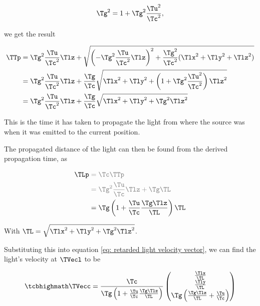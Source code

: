 \begin{derivation}
	\begin{equation}
		\Tg ^2 = 1+\Tg ^2\frac{\Tu ^2}{\Tc ^2},
	\end{equation}

	we get the result

	\begin{equation}
		\begin{aligned}
			\TTp  & = \Tg ^2\frac{\Tu }{\Tc ^2} \Tlz  + \sqrt{\left(-\Tg ^2\frac{\Tu }{\Tc ^2} \Tlz  \right)^2+\frac{\Tg ^2}{\Tc ^2}(\Tlx ^2 + \Tly ^2+ \Tlz ^2)} \\
			    & = \Tg ^2\frac{\Tu }{\Tc ^2} \Tlz  + \frac{\Tg }{\Tc }\sqrt{\Tlx ^2+ \Tly ^2+\left(1+\Tg ^2\frac{\Tu ^2}{\Tc ^2}\right) \Tlz ^2}               \\
			    & = \Tg ^2\frac{\Tu }{\Tc ^2} \Tlz  + \frac{\Tg }{\Tc }\sqrt{\Tlx ^2 + \Tly ^2+\Tg ^2 \Tlz ^2}
		\end{aligned}
	\end{equation}

	This is the time it has taken to propagate the light from where the source was when it was emitted to the current position.

\end{derivation}

The propagated distance of the light can then be found from the derived propagation time, as

\begin{equation}
	\label{eq: propagation distance}
	\begin{aligned}
		\TLp  & \color{gray} = \Tc  \TTp                                              \\
		      & \color{gray} = \Tg ^2 \frac{\Tu }{\Tc } \Tlz  + \Tg   \TL             \\
		      & = \Tg  \left( 1 + \frac{\Tu }{\Tc } \frac{\Tg  \Tlz  }{\TL } \right) \TL
	\end{aligned}
\end{equation}

With $ \TL =\sqrt{\Tlx ^2+\Tly ^2+\Tg ^2 \Tlz ^2}$.

Substituting this into equation \eqref{eq: retarded light velocity vector}, we can find the light's velocity at $\TVecl $ to be

\begin{equation}
	\label{eq: direction of light from moving source}
	\mhl{
		\TVecc  =
		\frac{\Tc }{\Tg  \left( 1 + \frac{\Tu }{\Tc } \frac{\Tg  \Tlz  }{\TL } \right)}
		\begin{pmatrix}
			\frac{\Tlx  }{\TL } \\
			\frac{\Tly  }{\TL } \\
			\Tg  \left( \frac{\Tg  \Tlz  }{\TL } + \frac{\Tu }{\Tc } \right)
		\end{pmatrix}
	}
\end{equation}

